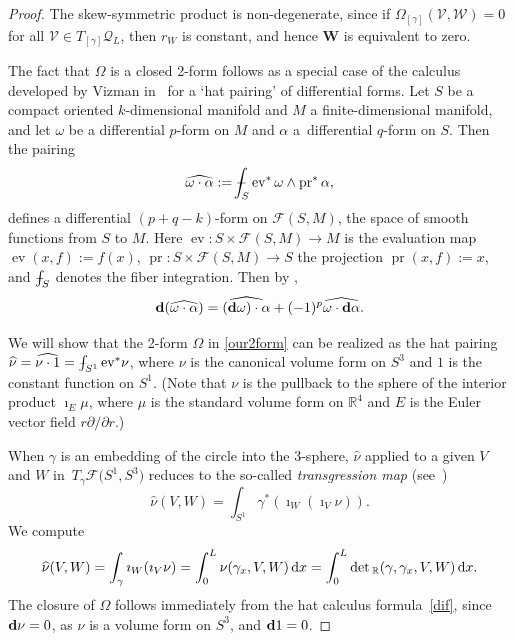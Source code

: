 \documentclass[10pt,a4paper]{amsart}
\def\Xint#1{\mathchoice
{\XXint\displaystyle\textstyle{#1}}%
{\XXint\textstyle\scriptstyle{#1}}%
{\XXint\scriptstyle\scriptscriptstyle{#1}}%
{\XXint\scriptscriptstyle\scriptscriptstyle{#1}}%
\!\int}
\def\XXint#1#2#3{{\setbox0=\hbox{$#1{#2#3}{\int}$ }
\vcenter{\hbox{$#2#3$ }}\kern-.6\wd0}}
\def\dashint{\Xint-}
\newcommand\Legq{\mathcal Q}
\newcommand\VW{\mathbf W}
\newcommand\qV{\mathcal V}%
\newcommand\qW{\mathcal W}
\newcommand{\dx}{\,{\rm d}x}
\def\gam{\gamma} %
\def\di{\partial}
\def\R{\mathbb R}
\numberwithin{equation}{section}
\begin{document}
\begin{proof}
The skew-symmetric product is non-degenerate, since
if $\Omega_{[\gamma]}(\qV, \qW) = 0$
for all $\qV \in T_{[\gamma]} \Legq_L$, then $r_W$ is constant, and hence $\VW$ is equivalent to zero.

\newcommand{\ev}{\operatorname{ev}}
\newcommand{\pr}{\operatorname{pr}}
The fact that $\Omega$ is a closed 2-form follows as a special case of the calculus developed by Vizman in~\cite{V11} for a `hat pairing' of differential forms. Let $S$ be a compact oriented $k$-dimensional manifold and $M$ a finite-dimensional manifold, and let $\omega$ be a differential $p$-form on $M$ and $\alpha$ a~differential $q$-form on $S$. Then the pairing
\begin{equation*}
\widehat{\omega \cdot \alpha}:=\dashint_S \ev^* \omega \wedge \pr^* \alpha,
\end{equation*}
defines a differential $(p+q-k)$-form on $\mathcal{F}(S,M)$, the space of smooth functions from $S$ to $M$. Here $\ev\colon S \times \mathcal{F}(S,M) \rightarrow M$ is the evaluation map $\ev(x, f):=f(x)$, $\pr\colon S \times \mathcal{F}(S,M) \rightarrow S$ the projection
 $\pr(x, f):=x$, and $\dashint_S$ denotes the fiber integration. Then by \cite[Theorem 1]{V11},
 \begin{equation}
 \label{dif}
 {\bf{d}}(\widehat{\omega \cdot \alpha})=\widehat{({\bf d} \omega) \cdot \alpha}+(-1)^p \widehat{\omega \cdot {\bf d} \alpha}.
 \end{equation}



We will show that the 2-form $\Omega$ in \eqref{our2form} can be realized as the hat pairing $\widehat\nu =\widehat{\nu \cdot 1}=\dashint_{S^1} {\rm ev}^* \nu$, where $\nu$ is the canonical volume form on $S^3$ and $1$ is the constant function on $S^1$. \big(Note that $\nu$ is the pullback to the sphere of the interior product $\imath_E \mu$, where $\mu$ is the standard volume form on $\R^4$ and $E$ is the Euler vector field $r\di/\di r$.\big)


When $\gam$ is an embedding of the circle into the 3-sphere, $\widehat\nu$ applied to a
given $V$ and $W$ in~$T_\gamma \mathcal{F}\bigl(S^1, S^3\bigr)$ reduces to the so-called {\em transgression map} (see~\cite{V11})
\[
\widehat\nu (V, W)=\int_{S^1}\gamma^*(\imath_W (\imath_V \nu) ).
\]
We compute
\[
\widehat\nu (V, W)=\int_\gamma \imath_W (\imath_V\nu) =\int_0^L \nu (\gam_x, V, W) \dx=\int_0^L \det{}_\R( \gam, \gam_x, V, W) \dx.
\]
The closure of $\Omega$ follows immediately from the hat calculus formula~\eqref{dif}, since
${\bf d} \nu=0$, as $\nu$ is a volume form on $S^3$, and ${\bf d} 1=0$.
\end{proof}
\end{document}
